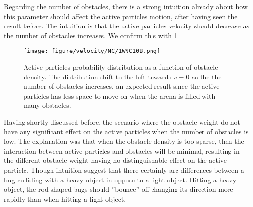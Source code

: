 


Regarding the number of obstacles, there is a strong intuition already about how this parameter 
should affect the active particles motion, after having seen the result before. 
The intuition is that the active particles velocity should decrease as the number of obstacles increases. 
We confirm this with \cref{fig:velkde_1WNC10B}


\begin{figure}[htpb]
    \centering
    \captionsetup{justification=centering,margin=2cm}
    \texttt{[image: figure/velocity/NC/1WNC10B.png]}
    \caption{Active particles probability distribution as a function of obstacle density. 
	    The distribution shift to the left towards $v=0$ as the the number of obstacles increases, 
	    an expected result since the active particles has less space to move on when the arena 
	    is filled with many obstacles.
    }
    \label{fig:velkde_1WNC10B}
\end{figure}

Having shortly discussed before, the scenario where the obstacle weight do not have any significant 
effect on the active particles when the number of obstacles is low. The explanation was that when the 
obstacle density is too sparse, then the interaction between active particles and obstacles will be minimal, 
resulting in the different obstacle weight having no distinguishable effect on the active particle. 
Though intuition suggest that there certainly are differences between a bug colliding with a heavy object
in oppose to a light object. Hitting a heavy object, the rod shaped bugs should ''bounce'' off changing 
its direction more rapidly than when hitting a light object. 

